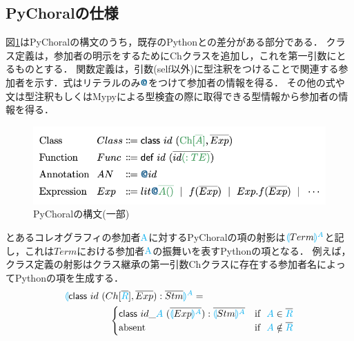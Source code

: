\documentclass{resume}
\newcommand{\projection}[2]{{\color{cyan}\llparenthesis}#1{\color{cyan}\rrparenthesis^#2}}
\newcommand{\mblue}[1]{\textbf{\textsf{\color{MidnightBlue}#1}}}
\newcommand{\cyan}[1]{\color{cyan}#1}
\begin{document}
\subsection{PyChoralの仕様}
図\ref{syntax}はPyChoralの構文のうち，既存のPythonとの差分がある部分である．
クラス定義は，参加者の明示をするためにChクラスを追加し，これを第一引数にとるものとする．
関数定義は，引数(self以外)に型注釈をつけることで関連する参加者を示す．式はリテラルのみ$\mblue{@}$をつけて参加者の情報を得る．
その他の式や文は型注釈もしくはMypyによる型検査の際に取得できる型情報から参加者の情報を得る．
\vspace{-8pt}
\begin{figure}[H]
  \includegraphics[scale=0.67]{image/diffpy.png}
  \caption{PyChoralの構文(一部)}
  \label{syntax}
\end{figure}
\vspace{-20pt}
とあるコレオグラフィの参加者$\cyan{\text{A}}$に対するPyChoralの項の射影は$\projection{Term}{A}$と記し，これは$Term$における参加者$\cyan{\text{A}}$の振舞いを表すPythonの項となる．
例えば，クラス定義の射影はクラス継承の第一引数Chクラスに存在する参加者名によってPythonの項を生成する．
\begin{alignat*}{2} 
  &\projection{\textsf{class} ~id~(Ch[\overline{\cyan{R}}],\overline{Exp}):\overline{Stm}}{A}=\\
  &
  ~~~~~~~~~~~~~~\begin{cases}
    \textsf{class} ~id\_{\cyan{A}}~(\overline{\projection{Exp}{A}}):\overline{\projection{Stm}{A}} & \text{if}~~ {\cyan{A}} \in \overline{\cyan{R}}\\
    \text{absent} & \text{if}~~ {\cyan{A}} \notin \overline{\cyan{R}}\\
  \end{cases}
\end{alignat*}
\end{document}
